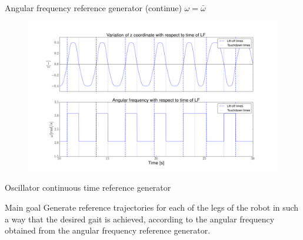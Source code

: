 \documentclass{beamer}
\begin{document}
\begin{frame}{Angular frequency reference generator (continue)}
\centering$\omega = \bar{\omega}$
\begin{figure}[H]\centering
			\includegraphics[width=1\textwidth]{HeightTime.png}
\end{figure}
\end{frame}

\begin{frame}{Oscillator continuous time reference generator}
	\begin{block}{Main goal}
		\Large Generate reference trajectories for each of the legs of the robot in such a way that the desired gait is achieved, according to the angular frequency obtained from the angular frequency reference generator.
	\end{block}
\end{frame}
\end{document}
